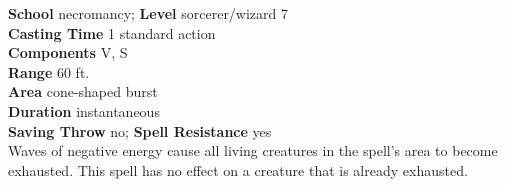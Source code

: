 \textbf{School} necromancy; \textbf{Level} sorcerer/wizard 7\\
\textbf{Casting Time} 1 standard action\\
\textbf{Components} V, S\\
\textbf{Range} 60 ft.\\
\textbf{Area} cone-shaped burst\\
\textbf{Duration} instantaneous\\
\textbf{Saving Throw} no; \textbf{Spell Resistance} yes\\
Waves of negative energy cause all living creatures in the spell's area to become exhausted. This spell has no effect on a creature that is already exhausted.\\
